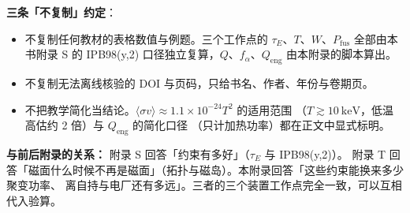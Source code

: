 \textbf{三条「不复制」约定}：
\begin{itemize}
  \item 不复制任何教材的表格数值与例题。三个工作点的 $\tau_E$、$T$、$W$、$P_{\mathrm{fus}}$
        全部由本书附录 S 的 IPB98(y,2) 口径独立复算，$Q$、$f_\alpha$、$Q_{\mathrm{eng}}$
        由本附录的脚本算出。
  \item 不复制无法离线核验的 DOI 与页码，只给书名、作者、年份与卷期页。
  \item 不把教学简化当结论。$\langle\sigma v\rangle \approx 1.1\times10^{-24}T^2$ 的适用范围
        （$T\gtrsim10\ \mathrm{keV}$，低温高估约 2 倍）与 $Q_{\mathrm{eng}}$ 的简化口径
        （只计加热功率）都在正文中显式标明。
\end{itemize}

\textbf{与前后附录的关系：} 附录 S 回答「约束有多好」（$\tau_E$ 与 IPB98(y,2)）。
附录 T 回答「磁面什么时候不再是磁面」（拓扑与磁岛）。本附录回答「这些约束能换来多少聚变功率、
离自持与电厂还有多远」。三者的三个装置工作点完全一致，可以互相代入验算。
\endgroup
